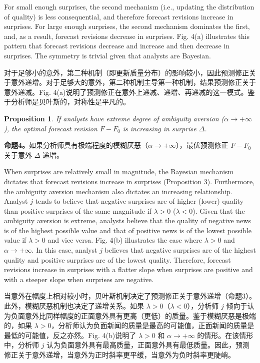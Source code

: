 \documentclass[12pt,a4paper]{article}
\newenvironment{original}
  {\par\medskip\noindent\ignorespaces}
  {\par\medskip}
\newenvironment{translation}
  {\par\noindent{\color{transblue}\ignorespaces}}
  {\par\bigskip}
\newtheorem{proposition}[theorem]{Proposition}
\begin{document}
\begin{original}
For small enough surprises, the second mechanism (i.e., updating the distribution of quality) is less consequential, and therefore forecast revisions increase in surprises. For large enough surprises, the second mechanism dominates the first, and, as a result, forecast revisions decrease in surprises. Fig. 4(a) illustrates this pattern that forecast revisions decrease and increase and then decrease in surprises. The symmetry is trivial given that analysts are Bayesian.
\end{original}
\begin{translation}
对于足够小的意外，第二种机制（即更新质量分布）的影响较小，因此预测修正关于意外递增。对于足够大的意外，第二种机制主导第一种机制，结果预测修正关于意外递减。Fig. 4(a)说明了预测修正在意外上递减、递增、再递减的这一模式。鉴于分析师是贝叶斯的，对称性是平凡的。
\end{translation}

\begin{proposition}
If analysts have extreme degree of ambiguity aversion ($\alpha \to +\infty$), the optimal forecast revision $F - F_0$ is increasing in surprise $\Delta$.
\end{proposition}
\begin{translation}
\textbf{命题4。}如果分析师具有极端程度的模糊厌恶（$\alpha \to +\infty$），最优预测修正 $F - F_0$ 关于意外 $\Delta$ 递增。
\end{translation}

\begin{original}
When surprises are relatively small in magnitude, the Bayesian mechanism dictates that forecast revisions increase in surprises (Proposition 3). Furthermore, the ambiguity aversion mechanism also dictates an increasing relationship. Analyst $j$ tends to believe that negative surprises are of higher (lower) quality than positive surprises of the same magnitude if $\lambda > 0$ ($\lambda < 0$). Given that the ambiguity aversion is extreme, analysts believe that the quality of negative news is of the highest possible value and that of positive news is of the lowest possible value if $\lambda > 0$ and vice versa. Fig. 4(b) illustrates the case where $\lambda > 0$ and $\alpha \to +\infty$. In this case, analyst $j$ believes that negative surprises are of the highest quality and positive surprises are of the lowest quality. Therefore, forecast revisions increase in surprises with a flatter slope when surprises are positive and with a steeper slope when surprises are negative.
\end{original}
\begin{translation}
当意外在幅度上相对较小时，贝叶斯机制决定了预测修正关于意外递增（命题3）。此外，模糊厌恶机制也决定了递增关系。如果 $\lambda > 0$（$\lambda < 0$），分析师 $j$ 倾向于认为负面意外比同样幅度的正面意外具有更高（更低）的质量。鉴于模糊厌恶是极端的，如果 $\lambda > 0$，分析师认为负面新闻的质量是最高的可能值，正面新闻的质量是最低的可能值，反之亦然。Fig. 4(b)说明了 $\lambda > 0$ 和 $\alpha \to +\infty$ 的情形。在该情形中，分析师 $j$ 认为负面意外具有最高质量，正面意外具有最低质量。因此，预测修正关于意外递增，当意外为正时斜率更平缓，当意外为负时斜率更陡峭。
\end{translation}
\end{document}
